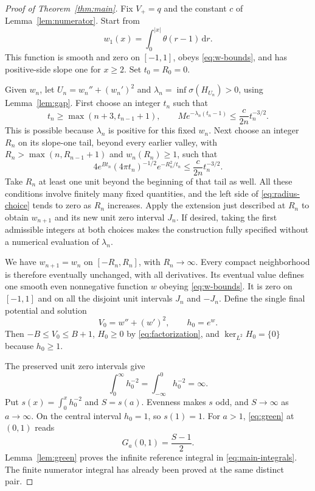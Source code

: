 \documentclass[11pt,a4paper]{article}
\newcommand{\dd}{\,\mathrm d}
\newcommand{\spec}{\sigma}
\begin{document}
\begin{proof}[Proof of Theorem~\ref{thm:main}]
Fix $V_+=q$ and the constant $c$ of Lemma~\ref{lem:numerator}. Start from
\[
 w_1(x)=\int_0^{|x|}\theta(r-1)\dd r.
\]
This function is smooth and zero on $[-1,1]$, obeys
\eqref{eq:w-bounds}, and has positive-side slope one for $x\geq2$.
Set $t_0=R_0=0$.

Given $w_n$, let $U_n=w_n''+(w_n')^2$ and
$\lambda_n=\inf\spec(H_{U_n})>0$, using Lemma~\ref{lem:gap}. First choose
an integer $t_n$ such that
\begin{equation}\label{eq:time-choice}
 t_n\geq\max(n+3,t_{n-1}+1),\qquad
 M e^{-\lambda_n(t_n-1)}\leq\frac{c}{2n}t_n^{-3/2}.
\end{equation}
This is possible because $\lambda_n$ is positive for this fixed $w_n$.
Next choose an integer $R_n$ on its slope-one tail, beyond every earlier
valley, with $R_n>\max(n,R_{n-1}+1)$ and $w_n(R_n)\geq1$, such that
\begin{equation}\label{eq:radius-choice}
 4e^{Bt_n}(4\pi t_n)^{-1/2}e^{-R_n^2/t_n}
       \leq\frac{c}{2n}t_n^{-3/2}.
\end{equation}
Take $R_n$ at least one unit beyond the beginning of that tail as well.
All these conditions involve finitely many fixed quantities, and the left
side of \eqref{eq:radius-choice} tends to zero as $R_n$ increases.
Apply the extension just described at $R_n$ to obtain $w_{n+1}$ and its new
unit zero interval $J_n$. If desired, taking the first admissible integers
at both choices makes the construction fully specified without a numerical
evaluation of $\lambda_n$.

We have $w_{n+1}=w_n$ on $[-R_n,R_n]$, with $R_n\to\infty$. Every compact
neighborhood is therefore eventually unchanged, with all derivatives. Its
eventual value defines one smooth even nonnegative function $w$ obeying
\eqref{eq:w-bounds}. It is zero on $[-1,1]$ and on all the disjoint unit
intervals $J_n$ and $-J_n$. Define the single final potential and solution
\begin{equation}\label{eq:final-potential}
 V_0=w''+(w')^2,\qquad h_0=e^w.
\end{equation}
Then $-B\leq V_0\leq B+1$, $H_0\geq0$ by
\eqref{eq:factorization}, and $\ker_{L^2}H_0=\{0\}$ because $h_0\geq1$.

The preserved unit zero intervals give
\begin{equation}\label{eq:infinite-resistance}
 \int_0^\infty h_0^{-2}=\int_{-\infty}^0 h_0^{-2}=\infty.
\end{equation}
Put $s(x)=\int_0^x h_0^{-2}$ and $S=s(a)$. Evenness makes $s$ odd, and
$S\to\infty$ as $a\to\infty$. On the central interval $h_0=1$, so
$s(1)=1$. For $a>1$, \eqref{eq:green} at $(0,1)$ reads
\[
 G_a(0,1)=\frac{S-1}{2}.
\]
Lemma~\ref{lem:green} proves the infinite reference integral in
\eqref{eq:main-integrals}. The finite numerator integral has already been
proved at the same distinct pair.


\end{proof}
\end{document}
